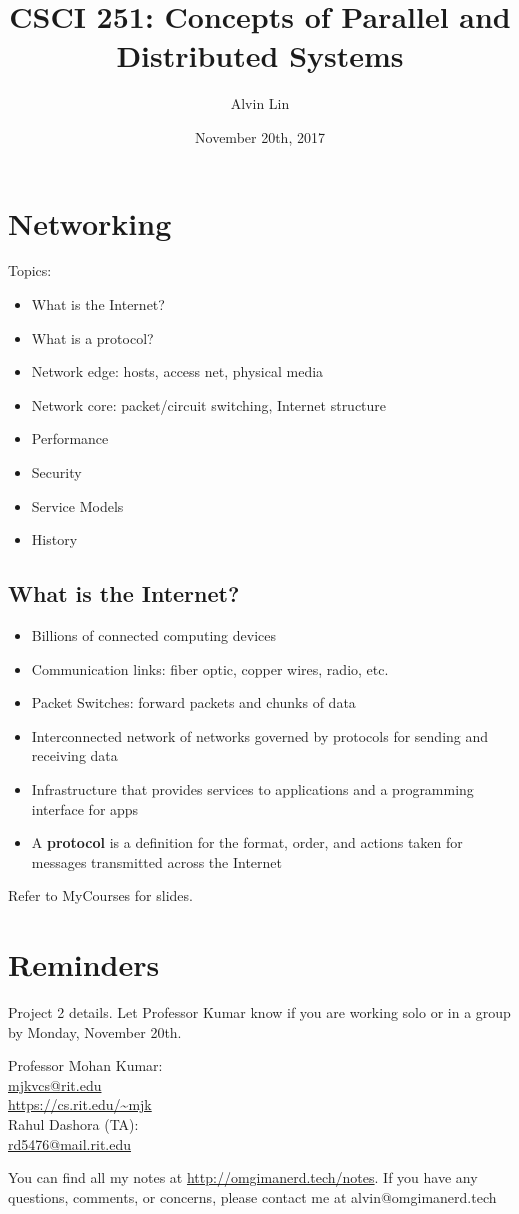 \documentclass{math}
\title{CSCI 251: Concepts of Parallel and Distributed Systems}
\author{Alvin Lin}
\date{November 20th, 2017}
\begin{document}
\maketitle

\section*{Networking}
Topics:
\begin{itemize}
  \item What is the Internet?
  \item What is a protocol?
  \item Network edge: hosts, access net, physical media
  \item Network core: packet/circuit switching, Internet structure
  \item Performance
  \item Security
  \item Service Models
  \item History
\end{itemize}

\subsection*{What is the Internet?}
\begin{itemize}
  \item Billions of connected computing devices
  \item Communication links: fiber optic, copper wires, radio, etc.
  \item Packet Switches: forward packets and chunks of data
  \item Interconnected network of networks governed by protocols for sending
  and receiving data
  \item Infrastructure that provides services to applications and a programming
  interface for apps
  \item A \textbf{protocol} is a definition for the format, order, and actions
  taken for messages transmitted across the Internet
\end{itemize}
Refer to MyCourses for slides.

\section*{Reminders}
Project 2 details. Let Professor Kumar know if you are working solo or in a
group by Monday, November 20th.

\noindent Professor Mohan Kumar: \\
\url{mjkvcs@rit.edu} \\
\url{https://cs.rit.edu/~mjk} \\

\noindent Rahul Dashora (TA): \\
\url{rd5476@mail.rit.edu} \\

\begin{center}
  You can find all my notes at \url{http://omgimanerd.tech/notes}. If you have
  any questions, comments, or concerns, please contact me at
  alvin@omgimanerd.tech
\end{center}
\end{document}
